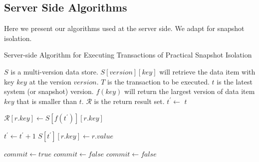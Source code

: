 \subsection{Server Side Algorithms}
Here we present our algorithms used at the server side. We adapt \cite{lu2023ncc} for snapshot isolation.


\begin{algorithm}
\caption{Server-side Algorithm for Executing Transactions of Practical Snapshot Isolation}
\label{alg:cap}
\begin{algorithmic}
\Require $S$ is a multi-version data store. $S[version][key]$ will retrieve the data item with key $key$ at the version $version$.
\Require $T$ is the transaction to be executed.
\Require $t$ is the latest system (or snapshot) version.
\Require $f(key)$ will return the largest version
of data item $key$ that is smaller than $t$. 
\Require $\mathcal{R}$ is the return result set.
\State $t^\prime \gets$  $t$ 

 
    \State $\mathcal{R}[r.key] \gets S[f(t^\prime)][r.key]$     

    \State $t^\prime \gets t^\prime + 1$
    \State $S[t^\prime][r.key] \gets r.value$

\EndIf
\EndFor
\State $commit \gets true$
     
    \State $commit \gets false$
    \EndIf
\Else {}
     
    \State $commit \gets false$
    \EndIf
\EndIf
\EndFor


\end{algorithmic}
\end{algorithm}





